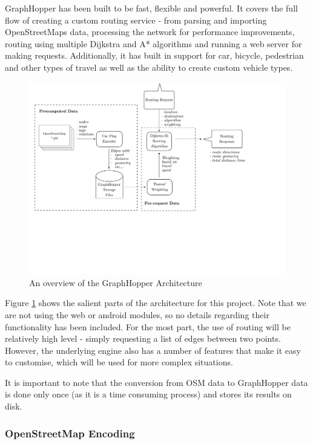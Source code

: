 \documentclass[ %
                    author={Alexander Hill},
                supervisor={Dr. Benjamin Sach},
                    degree={MEng},
                     title={MARMOSET},
                  subtitle={Multi-Agent Route Management using Online Simulation for Efficient Transportation},
                      type={research},
                      year={2016} ]{dissertation}
\begin{document}
GraphHopper has been built to be fast, flexible and powerful. It covers the full
flow of creating a custom routing service - from parsing and importing
OpenStreetMaps data, processing the network for performance improvements,
routing using multiple Dijkstra and A* algorithms and running a web server for
making requests. Additionally, it has built in support for car, bicycle,
pedestrian and other types of travel as well as the ability to create custom
vehicle types.

\begin{figure}[p]
    \centering
    \includegraphics[scale=0.5,page=1,clip,trim=0 8cm 4cm 0]{architecture}
    \caption{An overview of the GraphHopper Architecture}\label{fig:gh-arch}
\end{figure}

Figure \ref{fig:gh-arch} shows the salient parts of the architecture for this
project.  Note that we are not using the web or android modules, so no details
regarding their functionality has been included. For the most part, the use of
routing will be relatively high level - simply requesting a list of edges
between two points. However, the underlying engine also has a number of features
that make it easy to customise, which will be used for more complex situations.

It is important to note that the conversion from OSM data to GraphHopper data is
done only once (as it is a time consuming process) and stores its results on
disk.

\subsubsection{OpenStreetMap Encoding}
\end{document}
